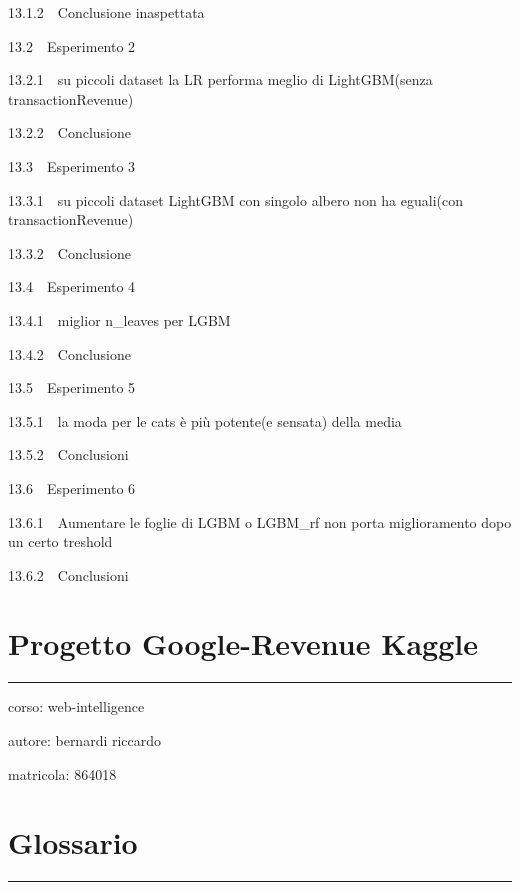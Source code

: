 \documentclass[11pt]{article}
\begin{document}
{{13.1.2~~}Conclusione inaspettata}

{{13.2~~}Esperimento 2}

{{13.2.1~~}su piccoli dataset la LR performa meglio di LightGBM(senza
transactionRevenue)}

{{13.2.2~~}Conclusione}

{{13.3~~}Esperimento 3}

{{13.3.1~~}su piccoli dataset LightGBM con singolo albero non ha
eguali(con transactionRevenue)}

{{13.3.2~~}Conclusione}

{{13.4~~}Esperimento 4}

{{13.4.1~~}miglior n\_leaves per LGBM}

{{13.4.2~~}Conclusione}

{{13.5~~}Esperimento 5}

{{13.5.1~~}la moda per le cats è più potente(e sensata) della media}

{{13.5.2~~}Conclusioni}

{{13.6~~}Esperimento 6}

{{13.6.1~~}Aumentare le foglie di LGBM o LGBM\_rf non porta
miglioramento dopo un certo treshold}

{{13.6.2~~}Conclusioni}

    \section{Progetto Google-Revenue
Kaggle}\label{progetto-google-revenue-kaggle}

\begin{center}\rule{0.5\linewidth}{\linethickness}\end{center}

corso: web-intelligence

autore: bernardi riccardo

matricola: 864018

    \section{Glossario}\label{glossario}

\begin{center}\rule{0.5\linewidth}{\linethickness}\end{center}
\end{document}
